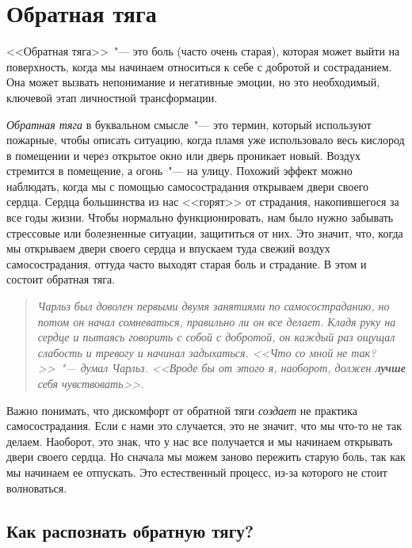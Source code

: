
\chapter{Обратная тяга}\label{Backdraft}

<<Обратная тяга>>~"--- это боль (часто очень старая), которая может выйти на поверхность, когда мы начинаем относиться к себе с добротой и состраданием. Она может вызвать непонимание и негативные эмоции, но это необходимый, ключевой этап личностной трансформации.

\emph{Обратная тяга} в буквальном смысле~"--- это термин, который используют пожарные, чтобы описать ситуацию, когда пламя уже использовало весь кислород в помещении и через открытое окно или дверь проникает новый. Воздух стремится в помещение, а огонь~"--- на улицу.  Похожий эффект можно наблюдать, когда мы с помощью самосострадания открываем двери своего сердца. Сердца большинства из нас <<горят>> от страдания, накопившегося за все годы жизни. Чтобы нормально функционировать, нам было нужно забывать стрессовые или болезненные ситуации, защититься от них. Это значит, что, когда мы открываем двери своего сердца и впускаем туда свежий воздух самосострадания, оттуда часто выходят старая боль и страдание. В этом и состоит обратная тяга.

\begin{quotation}
	\textit{Чарльз был доволен первыми двумя занятиями по самосостраданию, но потом он начал сомневаться, правильно ли он все делает. Кладя руку на сердце и пытаясь говорить с собой с добротой, он каждый раз ощущал слабость и тревогу и начинал задыхаться. <<Что со мной не так?>>~"--- думал Чарльз. <<Вроде бы от этого я, наоборот, должен \textbf{лучше} себя чувствовать>>.}
\end{quotation}

Важно понимать, что дискомфорт от обратной тяги \emph{создает} не практика самосострадания. Если с нами это случается, это не значит, что мы что-то не так делаем. Наоборот, это знак, что у нас все получается и мы начинаем открывать двери своего сердца. Но сначала мы можем заново пережить старую боль, так как мы начинаем ее отпускать. Это естественный процесс, из-за которого не стоит волноваться.  

\section*{Как распознать обратную тягу?} \label{How_Do_We_Recognize_Backdraft?}

